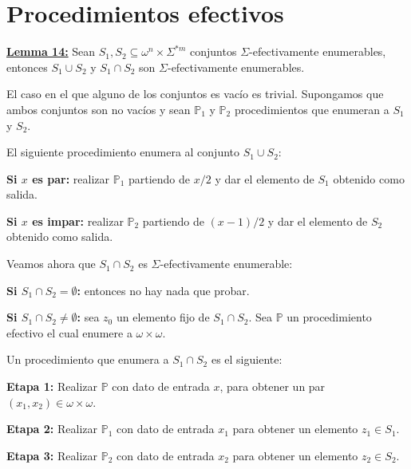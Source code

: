 \section{Procedimientos efectivos}

  \textbf{\underline{Lemma 14:}} Sean $S_{1}, S_{2}\subseteq \omega^{n}\times \Sigma^{\ast m}$ conjuntos
    $\Sigma$-efectivamente enumerables, entonces $S_{1} \cup S_{2}$ y $S_{1} \cap S_{2}$ son $\Sigma$-efectivamente
    enumerables.

  \PROOF El caso en el que alguno de los conjuntos es vacío es trivial. Supongamos que ambos conjuntos son no vacíos y
    sean $\mathbb{P}_{1}$ y $\mathbb{P}_{2}$ procedimientos que enumeran a $S_{1}$ y $S_{2}$.

    \vspace{3mm}
    \par El siguiente procedimiento enumera al conjunto $S_{1} \cup S_{2}$:

    \textbf{Si $x$ es par:} realizar $\mathbb{P}_{1}$ partiendo de $x/2$ y dar el elemento de $S_{1}$ obtenido como
    salida.

    \textbf{Si $x$ es impar:} realizar $\mathbb{P}_{2}$ partiendo de $(x-1)/2$ y dar el elemento de $S_{2}$ obtenido
    como salida.

    \vspace{3mm}
    \par Veamos ahora que $S_{1} \cap S_{2}$ es $\Sigma$-efectivamente enumerable:

    \textbf{Si $S_{1} \cap S_{2} = \emptyset$:} entonces no hay nada que probar.

    \textbf{Si $S_{1} \cap S_{2} \neq \emptyset$:} sea $z_{0}$ un elemento fijo de $S_{1} \cap S_{2}$. Sea
    $\mathbb{P}$ un procedimiento efectivo el cual enumere a $\omega \times \omega$.

    \vspace{3mm}
    \par Un procedimiento que enumera a $S_{1} \cap S_{2}$ es el siguiente:

    \textbf{Etapa 1:}
    Realizar $\mathbb{P}$ con dato de entrada $x$, para obtener un par $(x_{1}, x_{2}) \in \omega \times \omega $.

    \textbf{Etapa 2:}
    Realizar $\mathbb{P}_{1}$ con dato de entrada $x_{1}$ para obtener un elemento $z_{1} \in S_{1}$.

    \textbf{Etapa 3:}
    Realizar $\mathbb{P}_{2}$ con dato de entrada $x_{2}$ para obtener un elemento $z_{2} \in S_{2}$.

